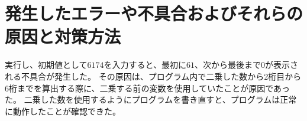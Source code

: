 

\section{発生したエラーや不具合およびそれらの原因と対策方法}
実行し、初期値として$6174$を入力すると、最初に$61$、次から最後まで0が表示される不具合が発生した。
その原因は、プログラム内で二乗した数から2桁目から6桁までを算出する際に、二乗する前の変数を使用していたことが原因であった。
二乗した数を使用するようにプログラムを書き直すと、プログラムは正常に動作したことが確認できた。



